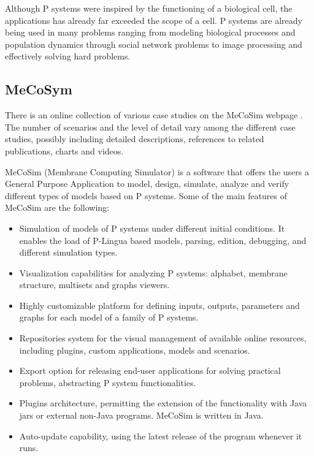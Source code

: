 Although P systems were inspired by the functioning of a biological cell, the applications has already far exceeded the scope of a cell. P systems are already being used in many problems ranging from modeling biological processes and population dynamics through social network problems to image processing and effectively solving hard problems.

\subsection{MeCoSym} %
\label{sub:mecosym}

There is an online collection of various case studies on the MeCoSim webpage \cite{MeCoSimWeb}. The number of scenarios and the level of detail vary among the different case studies, possibly including detailed descriptions, references to related publications, charts and videos.

 MeCoSim (Membrane Computing Simulator) \cite{Perez10MeCoSim} is a software that offers the users a General Purpose Application to model, design, simulate, analyze and verify different types of models based on P systems. Some of the main features of MeCoSim are the following:
\begin{itemize}
  \item Simulation of models of P systems under different initial conditions. It enables the load of P-Lingua based models, parsing, edition, debugging, and different simulation types.
  \item Visualization capabilities for analyzing P systems: alphabet, membrane structure, multisets and graphs viewers.
  \item Highly customizable platform for defining inputs, outputs, parameters and graphs for each model of a family of P systems.
  \item Repositories system for the visual management of available online resources, including plugins, custom applications, models and scenarios.
  \item Export option for releasing end-user applications for solving practical problems, abstracting P system functionalities.
  \item Plugins architecture, permitting the extension of the functionality with Java jars or external non-Java programs. MeCoSim is written in Java.
  \item Auto-update capability, using the latest release of the program whenever it runs.
\end{itemize}

